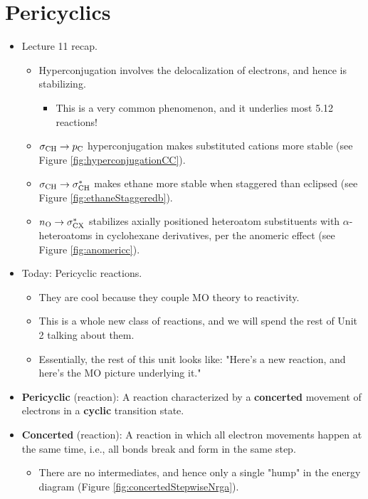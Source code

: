 \documentclass[../notes.tex]{subfiles}
\begin{document}
\section{Pericyclics}
\begin{itemize}
    \item {}Lecture 11 recap.
    \begin{itemize}
        \item Hyperconjugation involves the delocalization of electrons, and hence is stabilizing.
        \begin{itemize}
            \item This is a very common phenomenon, and it underlies most 5.12 reactions!
        \end{itemize}
        \item $\sigma_{\ce{CH}}\to p_{\ce{C}}$ hyperconjugation makes substituted cations more stable (see Figure \ref{fig:hyperconjugationCC}).
        \item $\sigma_{\ce{CH}}\to\sigma_{\ce{CH}}^*$ makes ethane more stable when staggered than eclipsed (see Figure \ref{fig:ethaneStaggeredb}).
        \item $n_{\ce{O}}\to\sigma_{\ce{CX}}^*$ stabilizes axially positioned heteroatom substituents with $\alpha$-heteroatoms in cyclohexane derivatives, per the anomeric effect (see Figure \ref{fig:anomericc}).
    \end{itemize}
    \item Today: Pericyclic reactions.
    \begin{itemize}
        \item They are cool because they couple MO theory to reactivity.
        \item This is a whole new class of reactions, and we will spend the rest of Unit 2 talking about them.
        \item Essentially, the rest of this unit looks like: "Here's a new reaction, and here's the MO picture underlying it."
    \end{itemize}
    \item \textbf{Pericyclic} (reaction): A reaction characterized by a \textbf{concerted} movement of electrons in a \textbf{cyclic} transition state.
    \item \textbf{Concerted} (reaction): A reaction in which all electron movements happen at the same time, i.e., all bonds break and form in the same step.
    \begin{itemize}
        \item There are no intermediates, and hence only a single "hump" in the energy diagram (Figure \ref{fig:concertedStepwiseNrga}).

\end{itemize}
\end{itemize}
\end{document}
